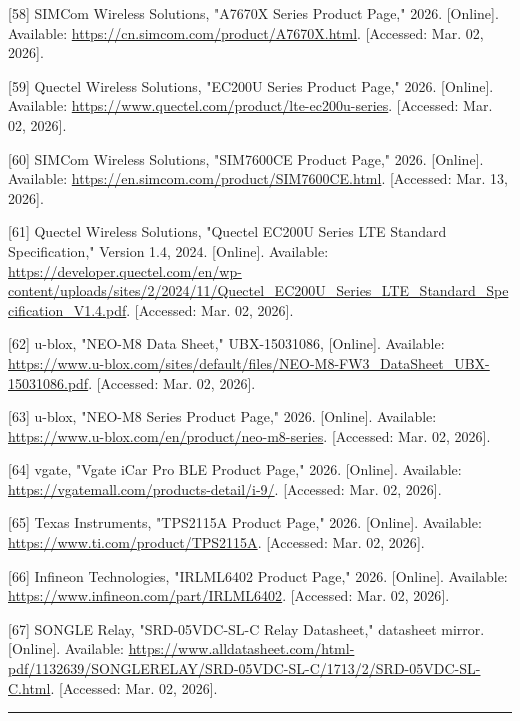 \documentclass[a4paper]{extarticle}
\begin{document}
{[}58{]} SIMCom Wireless Solutions, "A7670X Series Product Page," 2026.
{[}Online{]}. Available:
\url{https://cn.simcom.com/product/A7670X.html}. {[}Accessed: Mar. 02,
2026{]}.

{[}59{]} Quectel Wireless Solutions, "EC200U Series Product Page," 2026.
{[}Online{]}. Available:
\url{https://www.quectel.com/product/lte-ec200u-series}. {[}Accessed:
Mar. 02, 2026{]}.

{[}60{]} SIMCom Wireless Solutions, "SIM7600CE Product Page," 2026.
{[}Online{]}. Available:
\url{https://en.simcom.com/product/SIM7600CE.html}. {[}Accessed: Mar.
13, 2026{]}.

{[}61{]} Quectel Wireless Solutions, "Quectel EC200U Series LTE Standard
Specification," Version 1.4, 2024. {[}Online{]}. Available:
\url{https://developer.quectel.com/en/wp-content/uploads/sites/2/2024/11/Quectel_EC200U_Series_LTE_Standard_Specification_V1.4.pdf}.
{[}Accessed: Mar. 02, 2026{]}.

{[}62{]} u-blox, "NEO-M8 Data Sheet," UBX-15031086, {[}Online{]}.
Available:
\url{https://www.u-blox.com/sites/default/files/NEO-M8-FW3_DataSheet_UBX-15031086.pdf}.
{[}Accessed: Mar. 02, 2026{]}.

{[}63{]} u-blox, "NEO-M8 Series Product Page," 2026. {[}Online{]}.
Available: \url{https://www.u-blox.com/en/product/neo-m8-series}.
{[}Accessed: Mar. 02, 2026{]}.

{[}64{]} vgate, "Vgate iCar Pro BLE Product Page," 2026. {[}Online{]}.
Available: \url{https://vgatemall.com/products-detail/i-9/}.
{[}Accessed: Mar. 02, 2026{]}.

{[}65{]} Texas Instruments, "TPS2115A Product Page," 2026. {[}Online{]}.
Available: \url{https://www.ti.com/product/TPS2115A}. {[}Accessed: Mar.
02, 2026{]}.

{[}66{]} Infineon Technologies, "IRLML6402 Product Page," 2026.
{[}Online{]}. Available: \url{https://www.infineon.com/part/IRLML6402}.
{[}Accessed: Mar. 02, 2026{]}.

{[}67{]} SONGLE Relay, "SRD-05VDC-SL-C Relay Datasheet," datasheet
mirror. {[}Online{]}. Available:
\url{https://www.alldatasheet.com/html-pdf/1132639/SONGLERELAY/SRD-05VDC-SL-C/1713/2/SRD-05VDC-SL-C.html}.
{[}Accessed: Mar. 02, 2026{]}.

\begin{center}\rule{0.5\linewidth}{0.5pt}\end{center}

\end{document}
